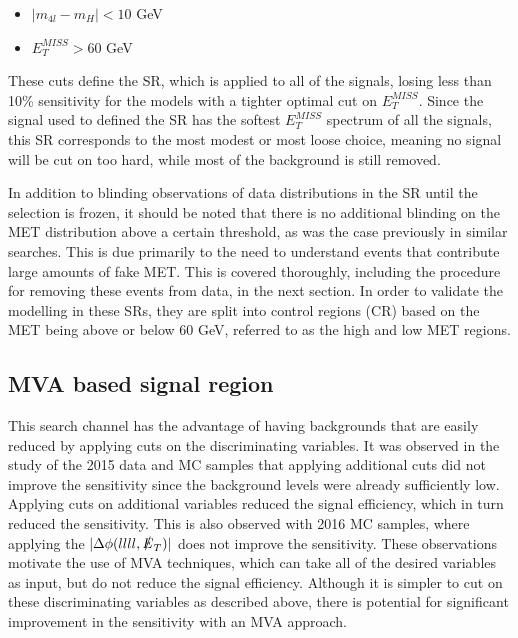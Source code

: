 \begin{itemize}
\item $|m_{4l} - m_H| < 10$ GeV
\item $E_T^{MISS} > 60$ GeV
\end{itemize}

These cuts define the SR, which is applied to all of the signals, losing less than 10\% sensitivity for the models with a tighter optimal cut on $E_T^{MISS}$. Since the signal used to defined the SR has the softest $E_T^{MISS}$ spectrum of all the signals, this SR corresponds to the most modest or most loose choice, meaning no signal will be cut on too hard, while most of the background is still removed. 


In addition to blinding observations of data distributions in the SR until the selection is frozen, it should be noted that there is no additional blinding on the MET distribution above a certain threshold, as was the case previously in similar searches. This is due primarily to the need to understand events that contribute large amounts of fake MET. This is covered thoroughly, including the procedure for removing these events from data, in the next section. In order to validate the modelling in these SRs, they are split into control regions (CR) based on the MET being above or below 60 GeV, referred to as the high and low MET regions. 


\subsection{MVA based signal region} \label{mvaopt}

This search channel has the advantage of having backgrounds that are easily reduced by applying cuts on the discriminating variables. It was observed in the study of the 2015 data and MC samples that applying additional cuts did not improve the sensitivity since the background levels were already sufficiently low. Applying cuts on additional variables reduced the signal efficiency, which in turn reduced the sensitivity. This is also observed with 2016 MC samples, where applying the $|\Delta\phi(llll, \slashed{E}_T)|$ does not improve the sensitivity. These observations motivate the use of MVA techniques, which can take all of the desired variables as input, but do not reduce the signal efficiency. Although it is simpler to cut on these discriminating variables as described above, there is potential for significant improvement in the sensitivity with an MVA approach.

